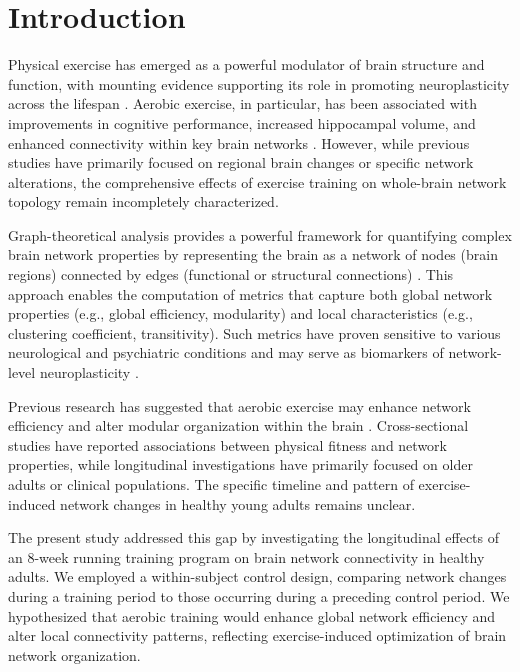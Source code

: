 \documentclass[12pt,a4paper]{article}
\begin{document}
\newpage

\section{Introduction}

Physical exercise has emerged as a powerful modulator of brain structure and function, with mounting evidence supporting its role in promoting neuroplasticity across the lifespan \citep{Voss2013}. Aerobic exercise, in particular, has been associated with improvements in cognitive performance, increased hippocampal volume, and enhanced connectivity within key brain networks \citep{Erickson2011, Colcombe2006}. However, while previous studies have primarily focused on regional brain changes or specific network alterations, the comprehensive effects of exercise training on whole-brain network topology remain incompletely characterized.

Graph-theoretical analysis provides a powerful framework for quantifying complex brain network properties by representing the brain as a network of nodes (brain regions) connected by edges (functional or structural connections) \citep{Bullmore2009}. This approach enables the computation of metrics that capture both global network properties (e.g., global efficiency, modularity) and local characteristics (e.g., clustering coefficient, transitivity). Such metrics have proven sensitive to various neurological and psychiatric conditions and may serve as biomarkers of network-level neuroplasticity \citep{Sporns2013}.

Previous research has suggested that aerobic exercise may enhance network efficiency and alter modular organization within the brain \citep{Voss2010}. Cross-sectional studies have reported associations between physical fitness and network properties, while longitudinal investigations have primarily focused on older adults or clinical populations. The specific timeline and pattern of exercise-induced network changes in healthy young adults remains unclear.

The present study addressed this gap by investigating the longitudinal effects of an 8-week running training program on brain network connectivity in healthy adults. We employed a within-subject control design, comparing network changes during a training period to those occurring during a preceding control period. We hypothesized that aerobic training would enhance global network efficiency and alter local connectivity patterns, reflecting exercise-induced optimization of brain network organization.
\end{document}
